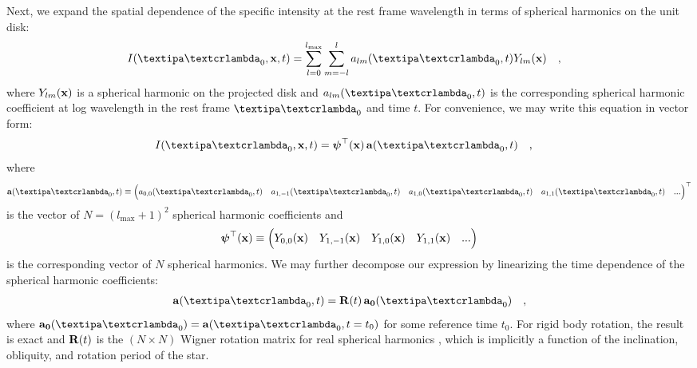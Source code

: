 \documentclass[modern]{aastex631}
\begin{document}
Next, we expand the spatial dependence of the specific intensity at the rest frame wavelength in terms of spherical harmonics on the unit disk:
%
\begin{align}
    \label{eq:deconv:Ixi0}
    I(\lnlam_0, \x, t)
     & =
    \sum_{l=0}^{l_\mathrm{max}}\sum_{m=-l}^{l} a_{lm}(\lnlam_0, t) Y_{lm}(\x)
    \quad ,
\end{align}
%
where $Y_{lm}({\mathbf{x}})$ is a spherical harmonic on the projected disk and $a_{lm}(\lnlam_0, t)$ is the corresponding spherical harmonic coefficient at log wavelength in the rest frame $\lnlam_0$ and time $t$. 
For convenience, we may write this equation in vector form:
%
\begin{align}
    \label{eq:deconv:Ivec}
    I(\lnlam_0, \x, t) & =
    \ylmbasis(\x) \,
    \alm(\lnlam_0, t)
    \quad ,
\end{align}
%
where
%
\begin{align}
    \label{eq:deconv:alm}
    \alm(\lnlam_0, t) \equiv
    \Big(
    a_{0,0}(\lnlam_0, t) \quad 
    a_{1,-1}(\lnlam_0, t) \quad 
    a_{1,0}(\lnlam_0, t) \quad 
    a_{1,1}(\lnlam_0, t) \quad
    ...
    \Big)^\top
\end{align}
%
is the vector of $N = (l_\mathrm{max} + 1)^2$ spherical harmonic coefficients and
%
\begin{align}
    \label{eq:deconv:ylmbasis}
    \boldsymbol{\psi}^\top({\mathbf{x}}) \equiv
    \Big(
    Y_{0,0}({\mathbf{x}}) \quad 
    Y_{1,-1}({\mathbf{x}}) \quad 
    Y_{1,0}({\mathbf{x}}) \quad 
    Y_{1,1}({\mathbf{x}}) \quad
    ...
    \Big)
\end{align}
%
is the corresponding vector of $N$ spherical harmonics. 
We may further decompose our expression by linearizing the time dependence of the spherical harmonic coefficients:
%
\begin{align}
    \label{eq:deconv:R}
    \alm(\lnlam_0, t) = \R(t) \, \azero(\lnlam_0)
    \quad ,
\end{align}
%
where $\azero(\lnlam_0) = \bvec{a}(\lnlam_0, t=t_0)$ for some reference time $t_0$.
For rigid body rotation, the result is exact and ${\mathbf{R}}(t)$ is the $(N \times N)$ Wigner rotation matrix for real spherical harmonics
\citep[e.g.][]{AlvarezCollado1989}, which is implicitly a function of the inclination, obliquity, and rotation period of the star.
\end{document}
